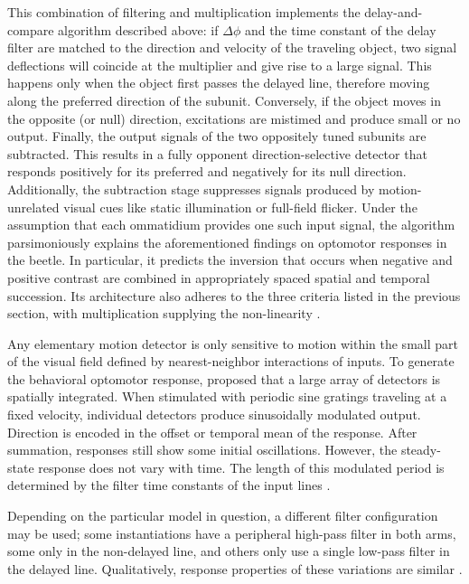 This combination of filtering and multiplication implements the delay-and-compare algorithm described above: if $\Delta\phi$ and the time constant of the delay filter are matched to the direction and velocity of the traveling object, two signal deflections will coincide at the multiplier and give rise to a large signal. This happens only when the object first passes the delayed line, therefore moving along the preferred direction of the subunit. Conversely, if the object moves in the opposite (or null) direction, excitations are mistimed and produce small or no output. Finally, the output signals of the two oppositely tuned subunits are subtracted. This results in a fully opponent direction-selective detector that responds positively for its preferred and negatively for its null direction. Additionally, the subtraction stage suppresses signals produced by motion-unrelated visual cues like static illumination or full-field flicker. Under the assumption that each ommatidium provides one such input signal, the algorithm parsimoniously explains the aforementioned findings on optomotor responses in the beetle. In particular, it predicts the inversion that occurs when negative and positive contrast are combined in appropriately spaced spatial and temporal succession. Its architecture also adheres to the three criteria listed in the previous section, with multiplication supplying the non-linearity \citep{Borst:1989vp}.

Any elementary motion detector is only sensitive to motion within the small part of the visual field defined by nearest-neighbor interactions of inputs. To generate the behavioral optomotor response, \citet{Hassenstein:1956fa} proposed that a large array of detectors is spatially integrated. When stimulated with periodic sine gratings traveling at a fixed velocity, individual detectors produce sinusoidally modulated output. Direction is encoded in the offset or temporal mean of the response. After summation, responses still show some initial oscillations. However, the steady-state response does not vary with time. The length of this modulated period is determined by the filter time constants of the input lines \citep{Egelhaaf:1989wf,Egelhaaf:1989wd}.

Depending on the particular model in question, a different filter configuration may be used; some instantiations have a peripheral high-pass filter in both arms, some only in the non-delayed line, and others only use a single low-pass filter in the delayed line. Qualitatively, response properties of these variations are similar \citep{Borst:2003bz}.

